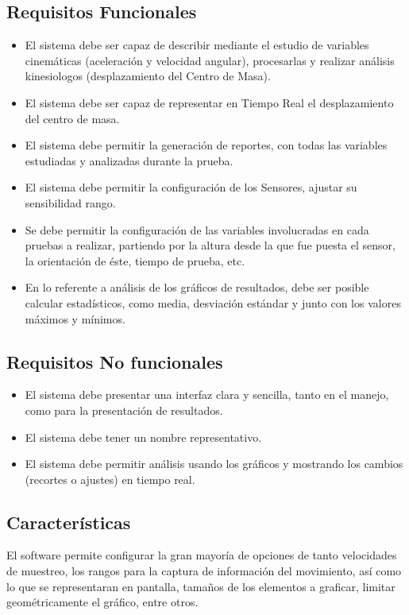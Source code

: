 \documentclass[12pt,a4paper]{article}
\begin{document}
			\subsection{Requisitos Funcionales}
			\begin{itemize}
				\item El sistema debe ser capaz de describir mediante el estudio de variables cinemáticas (aceleración y velocidad angular), procesarlas y realizar análisis kinesiologos (desplazamiento del Centro de Masa).
				\item El sistema debe ser capaz de representar en Tiempo Real el desplazamiento del centro de masa.
				\item El sistema debe permitir la generación de reportes, con todas las variables estudiadas y analizadas durante la prueba.
				\item El sistema debe permitir la configuración de los Sensores, ajustar su sensibilidad rango.
				\item Se debe permitir la configuración de las variables involucradas en cada pruebas a realizar, partiendo por la altura desde la que fue puesta el sensor, la orientación de éste, tiempo de prueba, etc.
				\item En lo referente a análisis de los gráficos de resultados, debe ser posible calcular estadísticos, como media, desviación estándar y junto con los valores máximos y mínimos.
			\end{itemize} 
			
			\subsection{Requisitos No funcionales}
			\begin{itemize}
				\item El sistema debe presentar una interfaz clara y sencilla, tanto en el manejo, como para la presentación de resultados.
				\item El sistema debe tener un nombre representativo.
				\item El sistema debe permitir análisis usando los gráficos y mostrando los cambios (recortes o ajustes) en tiempo real.
			\end{itemize}
			
			\subsection{Características}
			El software permite configurar la gran mayoría de opciones de tanto velocidades de muestreo, los rangos para la captura de información del movimiento, así como lo que se representaran en pantalla, tamaños de los elementos a graficar, limitar geométricamente el gráfico, entre otros.
			
\end{document}
